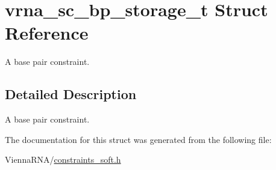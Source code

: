 \hypertarget{structvrna__sc__bp__storage__t}{}\section{vrna\+\_\+sc\+\_\+bp\+\_\+storage\+\_\+t Struct Reference}
\label{structvrna__sc__bp__storage__t}


A base pair constraint.  




\subsection{Detailed Description}
A base pair constraint. 

The documentation for this struct was generated from the following file\+:\begin{DoxyCompactItemize}
\item 
Vienna\+R\+N\+A/\hyperlink{constraints__soft_8h}{constraints\+\_\+soft.\+h}\end{DoxyCompactItemize}
